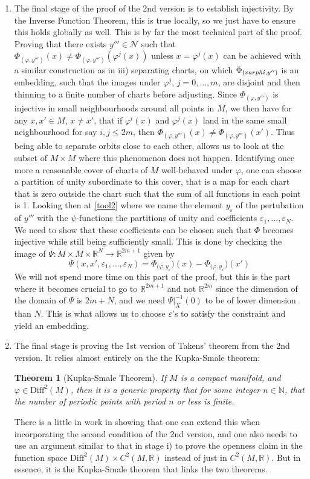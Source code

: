 \documentclass[11pt, a4paper]{memoir}
\theoremstyle{break}
\newtheorem{thm}{Theorem}
\theoremstyle{break}
\theoremstyle{nonumberplain}
\newcommand{\mN}{\mathbb{N}}
\newcommand{\mR}{\mathbb{R}}
\begin{document}
\begin{enumerate}[label=\roman*)]
	\item The final stage of the proof of the 2nd version is to establish injectivity. By the Inverse Function Theorem, this is true locally, so we just have to ensure this holds globally as well. This is by far the most technical part of the proof. Proving that there exists $y'''\in \mathcal{N}$ such that $\Phi_{(\varphi,y''')}(x)\neq \Phi_{(\varphi, y''')}(\varphi^j(x))$ unless $x=\varphi^j(x)$ can be achieved with a similar construction as in iii) separating charts, on which $\Phi_{(\\varphi,y'')}$ is an embedding, such that the images under $\varphi^j$, $j=0,\ldots,m$, are disjoint and then thinning to a finite number of charts before adjusting. Since $\Phi_{(\varphi,y''')}$ is injective in small neighbourhoods around all points in $M$, we then have for any $x,x'\in M$, $x\neq x'$, that if $\varphi^i(x)$ and $\varphi^j(x)$ land in the same small neighbourhood for say $i,j\leqslant 2m$, then $\Phi_{(\varphi,y''')}(x)\neq \Phi _{(\varphi,y''')}(x')$. Thus being able to separate orbits close to each other, allows us to look at the subset of $M\times M$ where this phenomenon does not happen. Identifying once more a reasonable cover of charts of $M$ well-behaved under $\varphi$, one can choose a partition of unity subordinate to this cover, that is a map for each chart that is zero outside the chart such that the sum of all functions in each point is 1. Looking then at \ref{tool2} where we name the element $y_{\varepsilon}$ of the pertubation of $y'''$ with the $\psi$-functions the partitions of unity and coefficients $\varepsilon_1,\ldots,\varepsilon_N$. We need to show that these coefficients can be chosen such that $\Phi$ becomes injective while still being sufficiently small. This is done by checking the image of $\Psi:M\times M\times \mR^N\to\mR^{2m+1}$ given by
	$$\Psi(x,x',\varepsilon_1,\ldots,\varepsilon_N)=\Phi_{(\varphi,y_{\varepsilon}})(x)-\Phi_{(\varphi,y_{\varepsilon}})(x')$$
	We will not spend more time on this part of the proof, but this is the part where it becomes crucial to go to $\mR^{2m+1}$ and not $\mR^{2m}$ since the dimension of the domain of $\Psi$ is $2m+N$, and we need $\Psi|_{X}^{-1}(0)$ to be of lower dimension than $N$. This is what allows us to choose $\varepsilon$'s to satisfy the constraint and yield an embedding. 
	\item The final stage is proving the 1st version of Takens' theorem from the 2nd version. It relies almost entirely on the the Kupka-Smale theorem:
	\begin{thm}[Kupka-Smale Theorem]
	If $M$ is a compact manifold, and $\varphi\in \text{Diff}^2(M)$, then it is a generic property that for some integer $n\in \mN$, that the number of periodic points with period $n$ or less is finite.
	\end{thm}
	There is a little in work in showing that one can extend this when incorporating the second condition of the 2nd version, and one also needs to use an argument similar to that in stage i) to prove the openness claim in the function space $\text{Diff}^2(M)\times C^2(M,\mR)$ instead of just in $C^2(M,\mR)$. But in essence, it is the Kupka-Smale theorem that links the two theorems.
\end{enumerate}  
\end{document}
